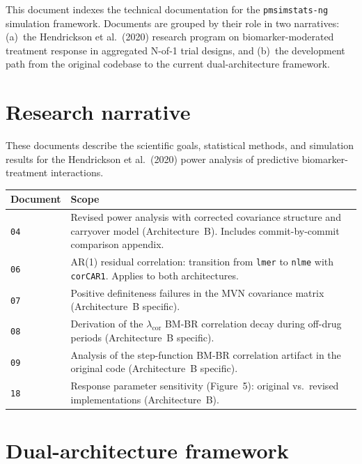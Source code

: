 \documentclass[11pt]{article}
\begin{document}
\maketitle
\thispagestyle{fancy}

This document indexes the technical documentation for the
\texttt{pmsimstats-ng} simulation framework. Documents are
grouped by their role in two narratives: (a)~the Hendrickson
et al.\ (2020) research program on biomarker-moderated
treatment response in aggregated N-of-1 trial designs, and
(b)~the development path from the original codebase to the
current dual-architecture framework.

\section{Research narrative}

These documents describe the scientific goals, statistical
methods, and simulation results for the Hendrickson et al.\
(2020) power analysis of predictive biomarker-treatment
interactions.

\begin{center}
\begin{tabular}{lp{9cm}}
\toprule
\textbf{Document} & \textbf{Scope} \\
\midrule
\texttt{04} & Revised power analysis with corrected
  covariance structure and carryover model
  (Architecture~B). Includes commit-by-commit
  comparison appendix. \\
\texttt{06} & AR(1) residual correlation: transition
  from \texttt{lmer} to \texttt{nlme} with
  \texttt{corCAR1}. Applies to both architectures. \\
\texttt{07} & Positive definiteness failures in the MVN
  covariance matrix (Architecture~B specific). \\
\texttt{08} & Derivation of the $\lambda_{\text{cor}}$
  BM-BR correlation decay during off-drug periods
  (Architecture~B specific). \\
\texttt{09} & Analysis of the step-function BM-BR
  correlation artifact in the original code
  (Architecture~B specific). \\
\texttt{18} & Response parameter sensitivity (Figure~5):
  original vs.\ revised implementations
  (Architecture~B). \\
\bottomrule
\end{tabular}
\end{center}

\section{Dual-architecture framework}
\end{document}
